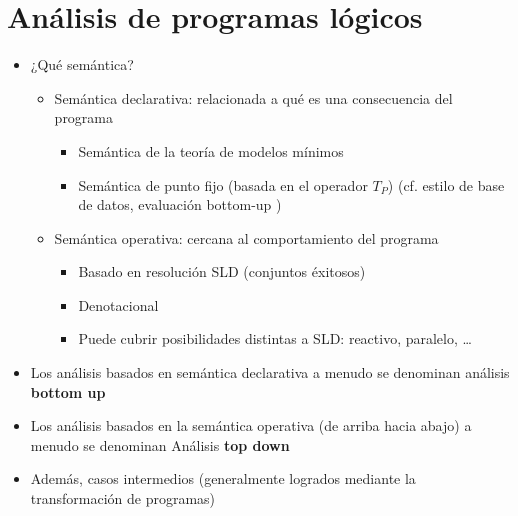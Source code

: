 \documentclass[11pt]{article}
\begin{document}
\section*{Análisis de programas lógicos}
\label{sec:org4fa0ef8}
\begin{itemize}
\item ¿Qué semántica?
\begin{itemize}
\item Semántica declarativa: relacionada a qué es una consecuencia del programa
\begin{itemize}
\item Semántica de la teoría de modelos mínimos
\item Semántica de punto fijo (basada en el operador \(T_P\))
(cf. estilo de base de datos, evaluación bottom-up )
\end{itemize}
\item Semántica operativa: cercana al comportamiento del programa
\begin{itemize}
\item Basado en resolución SLD (conjuntos éxitosos)
\item Denotacional
\item Puede cubrir posibilidades distintas a SLD: reactivo, paralelo, \ldots{}
\end{itemize}
\end{itemize}
\item Los análisis basados en semántica declarativa a menudo se denominan análisis \textbf{bottom up}
\item Los análisis basados en la semántica operativa (de arriba hacia
abajo) a menudo se denominan Análisis \textbf{top down}
\item Además, casos intermedios (generalmente logrados mediante la
transformación de programas)
\end{itemize}
\end{document}
